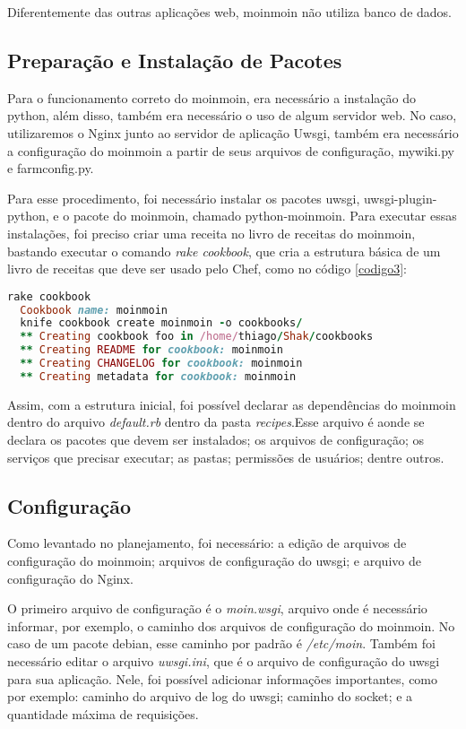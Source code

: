 Diferentemente das outras aplicações web, moinmoin não utiliza banco de dados.

\subsection{Preparação e Instalação de Pacotes}

Para o funcionamento correto do moinmoin, era necessário a instalação do python, além
disso, também era necessário o uso de algum servidor web. No caso, utilizaremos o Nginx
junto ao servidor de aplicação Uwsgi, também era necessário a configuração do 
moinmoin a partir de seus
arquivos de configuração, mywiki.py e farmconfig.py.

Para esse procedimento, foi necessário instalar os pacotes uwsgi,
uwsgi-plugin-python, e o pacote do moinmoin, chamado python-moinmoin.
Para executar essas instalações, foi preciso criar uma receita no livro de receitas
do moinmoin, bastando executar o comando \textit{rake cookbook}, que cria a
estrutura básica de um livro de receitas que deve ser usado pelo Chef, como no código
\ref{codigo3}:

\begin{lstlisting}[language=Ruby,label=dice_index,caption={Exemplo de criação de estrutura básica de livro de receitas do moinmoin com shak}, label=codigo3]
  rake cookbook
  Cookbook name: moinmoin
  knife cookbook create moinmoin -o cookbooks/
  ** Creating cookbook foo in /home/thiago/Shak/cookbooks
  ** Creating README for cookbook: moinmoin
  ** Creating CHANGELOG for cookbook: moinmoin
  ** Creating metadata for cookbook: moinmoin
\end{lstlisting}

Assim, com a estrutura inicial, foi possível declarar as dependências do moinmoin
dentro do arquivo \textit{default.rb} dentro da pasta \textit{recipes}.Esse arquivo 
é aonde se declara os pacotes que devem ser instalados; os arquivos de configuração;
os serviços que precisar executar; as pastas; permissões de usuários; dentre outros.

\subsection{Configuração}

Como levantado no planejamento, foi necessário: a edição de arquivos de configuração
do moinmoin; arquivos de configuração do uwsgi; e arquivo de configuração
do Nginx.

O primeiro arquivo de configuração é o \textit{moin.wsgi}, arquivo onde é necessário
informar, por exemplo, o caminho dos arquivos de configuração do moinmoin. No caso
de um pacote debian, esse caminho por padrão é  \textit{/etc/moin}. Também foi necessário 
editar o arquivo \textit{uwsgi.ini}, que é o arquivo de configuração
do uwsgi para sua aplicação. Nele, foi possível adicionar informações importantes, como
por exemplo: caminho do arquivo de log do uwsgi; caminho do socket;
e a quantidade máxima de requisições.

